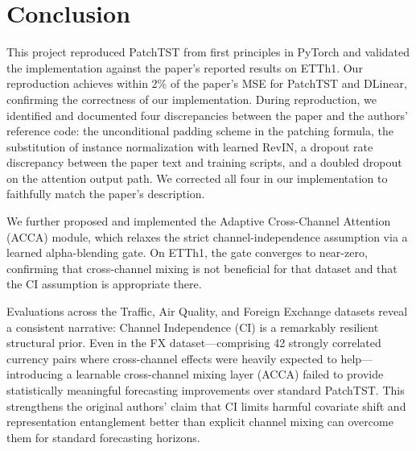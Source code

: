 \documentclass[11pt]{article}
\begin{document}
\section{Conclusion}

This project reproduced PatchTST from first principles in PyTorch and validated the implementation against the paper's reported results on ETTh1. Our reproduction achieves within 2\% of the paper's MSE for PatchTST and DLinear, confirming the correctness of our implementation. During reproduction, we identified and documented four discrepancies between the paper and the authors' reference code: the unconditional padding scheme in the patching formula, the substitution of instance normalization with learned RevIN, a dropout rate discrepancy between the paper text and training scripts, and a doubled dropout on the attention output path. We corrected all four in our implementation to faithfully match the paper's description.

We further proposed and implemented the Adaptive Cross-Channel Attention (ACCA) module, which relaxes the strict channel-independence assumption via a learned alpha-blending gate. On ETTh1, the gate converges to near-zero, confirming that cross-channel mixing is not beneficial for that dataset and that the CI assumption is appropriate there.

Evaluations across the Traffic, Air Quality, and Foreign Exchange datasets reveal a consistent narrative: Channel Independence (CI) is a remarkably resilient structural prior. Even in the FX dataset—comprising 42 strongly correlated currency pairs where cross-channel effects were heavily expected to help—introducing a learnable cross-channel mixing layer (ACCA) failed to provide statistically meaningful forecasting improvements over standard PatchTST. This strengthens the original authors' claim that CI limits harmful covariate shift and representation entanglement better than explicit channel mixing can overcome them for standard forecasting horizons.

\end{document}
